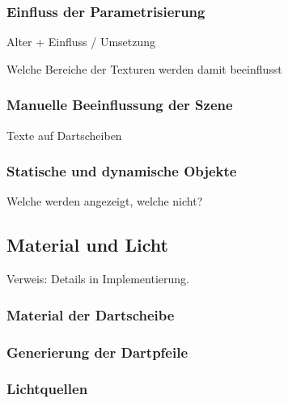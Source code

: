 \todo{}

\subsubsection{Einfluss der Parametrisierung}

Alter + Einfluss / Umsetzung

Welche Bereiche der Texturen werden damit beeinflusst
\todo{}

\subsubsection{Manuelle Beeinflussung der Szene}

Texte auf Dartscheiben
\todo{}

\subsubsection{Statische und dynamische Objekte}

Welche werden angezeigt, welche nicht?
\todo{}


\subsection{Material und Licht}  %
\label{sec:material_licht}

Verweis: Details in Implementierung.

\subsubsection{Material der Dartscheibe}

\todo{}

\subsubsection{Generierung der Dartpfeile}

\todo{}

\subsubsection{Lichtquellen}

\todo{}



